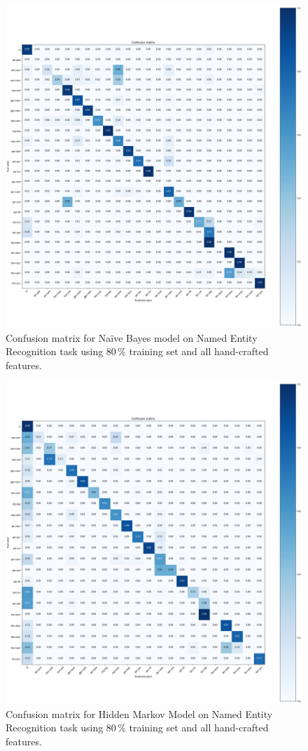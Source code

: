 \documentclass[twocolumns]{IEEEtran}
\begin{document}
\pagebreak
\begin{figure}
\centering
\includegraphics[scale=0.4]{NER_NB.png}
\caption{Confusion matrix for Na\"ive Bayes model on Named Entity Recognition task using 80\,\% training set and all hand-crafted features.}
\end{figure}

\pagebreak
\begin{figure}
\centering
\includegraphics[scale=0.4]{NER_HMM.png}
\caption{Confusion matrix for Hidden Markov Model on Named Entity Recognition task using 80\,\% training set and all hand-crafted features.}
\end{figure}
\end{document}
